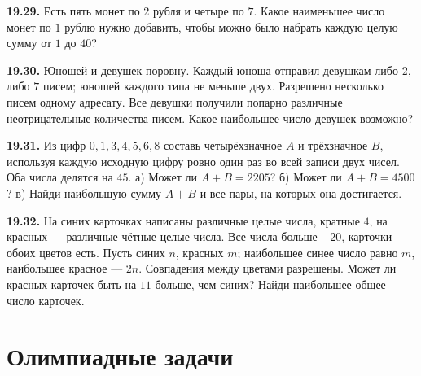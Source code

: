 \noindent\begin{minipage}[t]{\linewidth}\textbf{19.29.}\starmark{} Есть пять монет по \(2\) рубля и четыре по \(7\). Какое наименьшее число монет по \(1\) рублю нужно добавить, чтобы можно было набрать каждую целую сумму от \(1\) до \(40\)?\par\end{minipage}\par
\noindent\begin{minipage}[t]{\linewidth}\textbf{19.30.}\starmark{} Юношей и девушек поровну. Каждый юноша отправил девушкам либо \(2\), либо \(7\) писем; юношей каждого типа не меньше двух. Разрешено несколько писем одному адресату. Все девушки получили попарно различные неотрицательные количества писем. Какое наибольшее число девушек возможно?\par\end{minipage}\par
\noindent\begin{minipage}[t]{\linewidth}\textbf{19.31.}\starmark{} Из цифр \(0,1,3,4,5,6,8\) составь четырёхзначное \(A\) и трёхзначное \(B\), используя каждую исходную цифру ровно один раз во всей записи двух чисел. Оба числа делятся на \(45\). а) Может ли \(A+B=2205\)? б) Может ли \(A+B=4500\)? в) Найди наибольшую сумму \(A+B\) и все пары, на которых она достигается.\par\end{minipage}\par
\noindent\begin{minipage}[t]{\linewidth}\textbf{19.32.}\starmark{} На синих карточках написаны различные целые числа, кратные \(4\), на красных --- различные чётные целые числа. Все числа больше \(-20\), карточки обоих цветов есть. Пусть синих \(n\), красных \(m\); наибольшее синее число равно \(m\), наибольшее красное --- \(2n\). Совпадения между цветами разрешены. Может ли красных карточек быть на \(11\) больше, чем синих? Найди наибольшее общее число карточек.\par\end{minipage}\par
\par{}\section*{Олимпиадные задачи}
